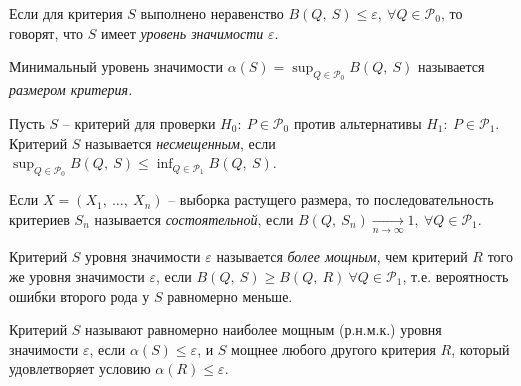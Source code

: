 \begin{definition}
    Если для критерия $\displaystyle S$ выполнено неравенство $\displaystyle B( Q,\ S) \leqslant \varepsilon ,\ \forall Q\in \mathcal{P}_{0}$, то говорят, что $\displaystyle S$ имеет \textit{уровень значимости}\textit{ }$\displaystyle \varepsilon $.
\end{definition}
\begin{definition}
    Минимальный уровень значимости $\displaystyle \alpha ( S) =\sup _{Q\in \mathcal{P}_{0}} B( Q,\ S)$ называется \textit{размером критерия}\textit{.}
\end{definition}
\begin{definition}
    Пусть $\displaystyle S$ -- критерий для проверки $\displaystyle H_{0} :\ P\in \mathcal{P}_{0}$ против альтернативы $\displaystyle H_{1} :\ P\in \mathcal{P}_{1}$. Критерий $\displaystyle S$ называется \textit{несмещенным}, если $\displaystyle \sup _{Q\in \mathcal{P}_{0}} B( Q,\ S) \leqslant \inf_{Q\in \mathcal{P}_{1}} B( Q,\ S)$.
\end{definition}
\begin{definition}
    Если $\displaystyle X=( X_{1} ,\ \dotsc ,\ X_{n})$ -- выборка растущего размера, то последовательность критериев $\displaystyle S_{n}$ называется \textit{состоятельной}, если $\displaystyle B( Q,\ S_n)\xrightarrow[n\rightarrow \infty ]{} 1,\ \forall Q\in \mathcal{P}_{1}$.
\end{definition}
\begin{definition}
    Критерий $S$ уровня значимости $\displaystyle \varepsilon $ называется \textit{более мощным}, чем критерий $\displaystyle R$ того же уровня значимости $\displaystyle \varepsilon $, если $\displaystyle B( Q,\ S) \geqslant B( Q,\ R) \ \forall Q\in \mathcal{P}_{1}$, т.е. вероятность ошибки второго рода у $\displaystyle S$ равномерно меньше.
\end{definition}
\begin{definition}
    Критерий $\displaystyle S$ называют равномерно наиболее мощным (р.н.м.к.) уровня значимости $\displaystyle \varepsilon $, если $\displaystyle \alpha ( S) \leqslant \varepsilon $, и $\displaystyle S$ мощнее любого другого критерия $\displaystyle R$, который удовлетворяет условию $\displaystyle \alpha ( R) \leqslant \varepsilon $.
\end{definition}